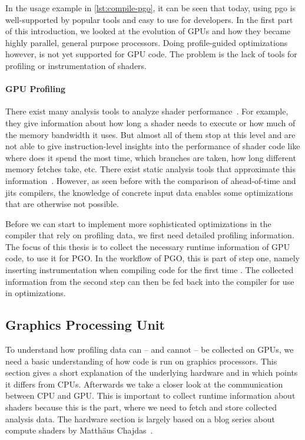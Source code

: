 In the usage example in \cref{lst:compile-pgo}, it can be seen that today, using \gls{pgo} is well-supported by popular tools and easy to use for developers. In the first part of this introduction, we looked at the evolution of GPUs and how they became highly parallel, general purpose processors. Doing profile-guided optimizations however, is not yet supported for GPU code. The problem is the lack of tools for profiling or instrumentation of shaders.

\paragraph{GPU Profiling} There exist many analysis tools to analyze shader performance~\cite{RenderDoc, NvidiaShaderPerf}. For example, they give information about how long a shader needs to execute or how much of the memory bandwidth it uses. But almost all of them stop at this level and are not able to give instruction-level insights into the performance of shader code like where does it spend the most time, which branches are taken, how long different memory fetches take, etc. There exist static analysis tools that approximate this information~\cite{AMDShaderAnalyzer}. However, as seen before with the comparison of ahead-of-time and \glspl{jit} compilers, the knowledge of concrete input data enables some optimizations that are otherwise not possible.

Before we can start to implement more sophisticated optimizations in the compiler that rely on profiling data, we first need detailed profiling information. The focus of this thesis is to collect the necessary runtime information of GPU code, to use it for PGO. In the workflow of PGO, this is part of step one, namely inserting instrumentation when compiling code for the first time%
. The collected information from the second step can then be fed back into the compiler for use in optimizations.

\subsection{Graphics Processing Unit}
To understand how profiling data can -- and cannot -- be collected on GPUs, we need a basic understanding of how code is run on graphics processors. This section gives a short explanation of the underlying hardware and in which points it differs from CPUs. Afterwards we take a closer look at the communication between CPU and GPU. This is important to collect runtime information about shaders because this is the part, where we need to fetch and store collected analysis data. The hardware section is largely based on a blog series about compute shaders by Matthäus Chajdas~\cite{Chajdas2018}.

